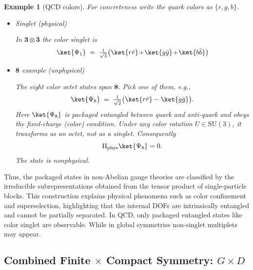 \documentclass[12pt,a4paper]{article}
\newtheorem{example}{Example}
\begin{document}
\begin{example}[QCD colors]	
	For concreteness write the quark colors as $\{r,g,b\}$.
	
	\begin{itemize}
		\item Singlet (physical)
		
		In $\mathbf 3\otimes\overline{\mathbf 3}$ the color singlet is	
		$$
		\ket{\Psi_{1}}
		\;=\;
		\tfrac1{\sqrt3}\bigl(
		\ket{r\bar r}\!+\!\ket{g\bar g}\!+\!\ket{b\bar b}
		\bigr)
		$$	
		
		\item $\mathbf 8$ example (unphysical)
		
		The eight color octet states span $\mathbf 8$.
		Pick one of them, e.g.,
		$$
		\ket{\Psi_{8}}
		\;=\;
		\tfrac1{\sqrt2}\bigl(
		\ket{r\bar r}-\ket{g\bar g}
		\bigr).
		$$		
		Here $\ket{\Psi_{8}}$ is packaged entangled between quark and anti-quark and obeys the fixed-charge (color) condition.		
		Under any color rotation $U \in \mathrm{SU}(3)$, it transforms as an octet, not as a singlet.
		Consequently		
		$$
		\Pi_{\text{phys}}\ket{\Psi_{8}}=0 .
		$$		
		The state is nonphysical.
	\end{itemize}	
\end{example}


Thus, the packaged states in non-Abelian gauge theories are classified by the irreducible subrepresentations obtained from the tensor product of single-particle blocks.
This construction explains physical phenomena such as color confinement \cite{Gross1973,Politzer1973} and superselection, highlighting that the internal DOFs are intrinsically entangled and cannot be partially separated.
In QCD, only packaged entangled states like color singlet are observable.
While in global symmetries non-singlet multiplets may appear.



\subsection{Combined Finite $\times$ Compact Symmetry: $G \times D$}
\end{document}

